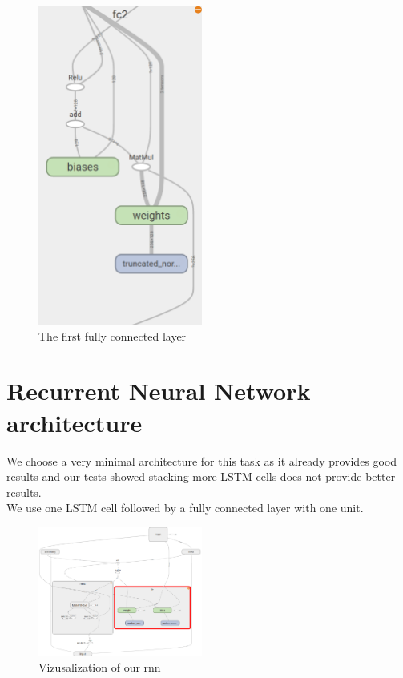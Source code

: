 \documentclass[twoside, twocolumn]{article}
\begin{document}
\begin{figure}[htb]
\centering
	\includegraphics[width=0.48\textwidth]{fc_layer.png}
	\caption{The first fully connected layer}
\end{figure}





\section{Recurrent Neural Network architecture}
We choose a very minimal architecture for this task as it already provides good results and our tests showed stacking more LSTM cells does not provide better results. \\
We use one LSTM cell followed by a fully connected layer with one unit.

\begin{figure}[htb]
\centering
	\includegraphics[width=0.48\textwidth]{rnn.png}
	\caption{Vizusalization of our rnn}
\end{figure}
\end{document}
